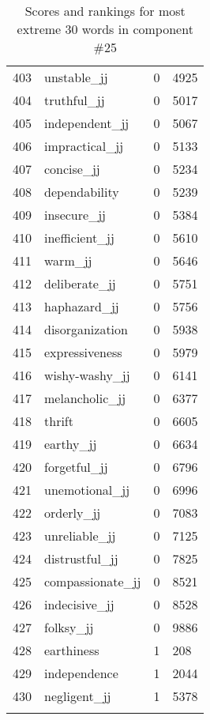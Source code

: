 \begin{longtable}[!htbp]{| rlr@{.}l |}
    403 & unstable\_jj & 0 & 4925 \\
    404 & truthful\_jj & 0 & 5017 \\
    405 & independent\_jj & 0 & 5067 \\
    406 & impractical\_jj & 0 & 5133 \\
    407 & concise\_jj & 0 & 5234 \\
    408 & dependability & 0 & 5239 \\
    409 & insecure\_jj & 0 & 5384 \\
    410 & inefficient\_jj & 0 & 5610 \\
    411 & warm\_jj & 0 & 5646 \\
    412 & deliberate\_jj & 0 & 5751 \\
    413 & haphazard\_jj & 0 & 5756 \\
    414 & disorganization & 0 & 5938 \\
    415 & expressiveness & 0 & 5979 \\
    416 & wishy-washy\_jj & 0 & 6141 \\
    417 & melancholic\_jj & 0 & 6377 \\
    418 & thrift & 0 & 6605 \\
    419 & earthy\_jj & 0 & 6634 \\
    420 & forgetful\_jj & 0 & 6796 \\
    421 & unemotional\_jj & 0 & 6996 \\
    422 & orderly\_jj & 0 & 7083 \\
    423 & unreliable\_jj & 0 & 7125 \\
    424 & distrustful\_jj & 0 & 7825 \\
    425 & compassionate\_jj & 0 & 8521 \\
    426 & indecisive\_jj & 0 & 8528 \\
    427 & folksy\_jj & 0 & 9886 \\
    428 & earthiness & 1 & 208 \\
    429 & independence & 1 & 2044 \\
    430 & negligent\_jj & 1 & 5378 \\
    \hline
    \caption{Scores and rankings for most extreme 30 words in component \#25} \\
\end{longtable}
